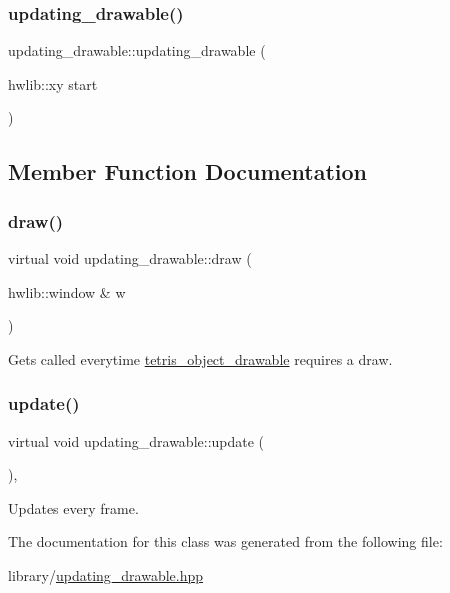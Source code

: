 \subsubsection{\texorpdfstring{updating\+\_\+drawable()}{updating\_drawable()}}
{\footnotesize\ttfamily updating\+\_\+drawable\+::updating\+\_\+drawable (\begin{DoxyParamCaption}\item[{hwlib\+::xy}]{start }\end{DoxyParamCaption})\hspace{0.3cm}{\ttfamily [inline]}}



\subsection{Member Function Documentation}
\mbox{\label{classupdating__drawable_af60a49bab0f1f062d7d38e2d0e89f061}} 
\subsubsection{\texorpdfstring{draw()}{draw()}}
{\footnotesize\ttfamily virtual void updating\+\_\+drawable\+::draw (\begin{DoxyParamCaption}\item[{hwlib\+::window \&}]{w }\end{DoxyParamCaption})\hspace{0.3cm}{\ttfamily [pure virtual]}}



Gets called everytime \hyperlink{classtetris__object__drawable}{tetris\+\_\+object\+\_\+drawable} requires a draw. 

\mbox{\label{classupdating__drawable_a15370bdb1a33551803314e87f1371e8d}} 
\subsubsection{\texorpdfstring{update()}{update()}}
{\footnotesize\ttfamily virtual void updating\+\_\+drawable\+::update (\begin{DoxyParamCaption}{ }\end{DoxyParamCaption})\hspace{0.3cm}{\ttfamily [inline]}, {\ttfamily [virtual]}}



Updates every frame. 



The documentation for this class was generated from the following file\+:\begin{DoxyCompactItemize}
\item 
library/\hyperlink{updating__drawable_8hpp}{updating\+\_\+drawable.\+hpp}\end{DoxyCompactItemize}
